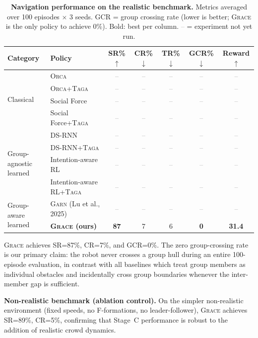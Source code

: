 \documentclass{article}
\newcommand{\grace}{\textsc{Grace}}
\newcommand{\garn}{\textsc{Garn}}
\newcommand{\taga}{\textsc{Taga}}
\newcommand{\orca}{\textsc{Orca}}
\newcommand{\tbd}{\textcolor{gray}{--}}
\newcommand{\best}[1]{\textbf{#1}}
\begin{document}
\begin{table}[h]
\centering
\caption{\textbf{Navigation performance on the realistic benchmark.}
Metrics averaged over 100 episodes $\times$ 3 seeds.
GCR = group crossing rate (lower is better; \grace{} is the only policy to achieve 0\%).
Bold: best per column. \tbd{} = experiment not yet run.}
\label{tab:main}
\small
\setlength{\tabcolsep}{5pt}
\begin{tabular}{llccccc}
\toprule
\textbf{Category} & \textbf{Policy} & \textbf{SR\%}$\uparrow$ & \textbf{CR\%}$\downarrow$ & \textbf{TR\%}$\downarrow$ & \textbf{GCR\%}$\downarrow$ & \textbf{Reward}$\uparrow$ \\
\midrule
\multirow{4}{*}{Classical}
  & \orca{}               & \tbd & \tbd & \tbd & \tbd & \tbd \\
  & \orca{}+\taga{}       & \tbd & \tbd & \tbd & \tbd & \tbd \\
  & Social Force          & \tbd & \tbd & \tbd & \tbd & \tbd \\
  & Social Force+\taga{}  & \tbd & \tbd & \tbd & \tbd & \tbd \\
\midrule
\multirow{4}{*}{\parbox{2.2cm}{Group-agnostic\\learned}}
  & DS-RNN                      & \tbd & \tbd & \tbd & \tbd & \tbd \\
  & DS-RNN+\taga{}              & \tbd & \tbd & \tbd & \tbd & \tbd \\
  & Intention-aware RL          & \tbd & \tbd & \tbd & \tbd & \tbd \\
  & Intention-aware RL+\taga{}  & \tbd & \tbd & \tbd & \tbd & \tbd \\
\midrule
\multirow{2}{*}{\parbox{2.2cm}{Group-aware\\learned}}
  & \garn{} (Lu et al., 2025)   & \tbd & \tbd & \tbd & \tbd & \tbd \\
  & \best{\grace{} (ours)}      & \best{87} & 7 & 6 & \best{0} & \best{31.4} \\
\bottomrule
\end{tabular}
\end{table}

\grace{} achieves SR=87\%, CR=7\%, and GCR=0\%.
The zero group-crossing rate is our primary claim: the robot never crosses
a group hull during an entire 100-episode evaluation, in contrast with all
baselines which treat group members as individual obstacles and incidentally
cross group boundaries whenever the inter-member gap is sufficient.

\textbf{Non-realistic benchmark (ablation control).}
On the simpler non-realistic environment (fixed speeds, no F-formations,
no leader-follower), \grace{} achieves SR=89\%, CR=5\%,
confirming that Stage~C performance is robust to the addition of
realistic crowd dynamics.
\end{document}
